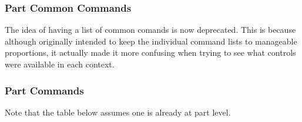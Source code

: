 \subsubsection{Part Common Commands}
\label{subsec:command_line_part_common_commands}
The idea of having a list of common comands is now deprecated. This is
because although originally intended to keep the individual command lists to manageable proportions, it actually made it more confusing when trying
to see what controls were available in each context.

\subsubsection{Part Commands}
\label{subsec:command_line_part_commands}

   Note that the table below assumes one is already at part level.

